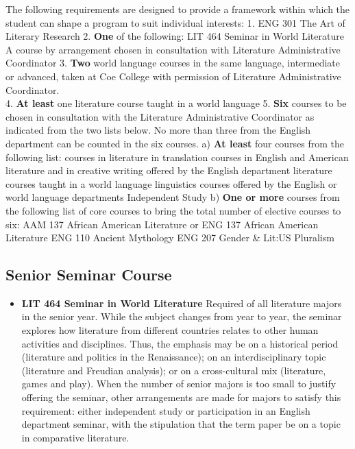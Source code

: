 \documentclass[
  letterpaper,
]{scrbook}
\providecommand{\tightlist}{%
  \setlength{\itemsep}{0pt}\setlength{\parskip}{0pt}}
\begin{document}
The following requirements are designed to provide a framework within
which the student can shape a program to suit individual interests: 1.
ENG 301 The Art of Literary Research 2. \textbf{One} of the following:
LIT 464 Seminar in World Literature A course by arrangement chosen in
consultation with Literature Administrative Coordinator 3. \textbf{Two}
world language courses in the same language, intermediate or advanced,
taken at Coe College with permission of Literature Administrative
Coordinator.\\
4. \textbf{At least} one literature course taught in a world language 5.
\textbf{Six} courses to be chosen in consultation with the Literature
Administrative Coordinator as indicated from the two lists below. No
more than three from the English department can be counted in the six
courses. a) \textbf{At least} four courses from the following list:
courses in literature in translation courses in English and American
literature and in creative writing offered by the English department
literature courses taught in a world language linguistics courses
offered by the English or world language departments Independent Study
b) \textbf{One or more} courses from the following list of core courses
to bring the total number of elective courses to six: AAM 137 African
American Literature or ENG 137 African American Literature ENG 110
Ancient Mythology ENG 207 Gender \& Lit:US Pluralism

\subsection{Senior Seminar Course}\label{senior-seminar-course}

\begin{itemize}
\tightlist
\item
  \textbf{LIT 464 Seminar in World Literature} Required of all
  literature majors in the senior year. While the subject changes from
  year to year, the seminar explores how literature from different
  countries relates to other human activities and disciplines. Thus, the
  emphasis may be on a historical period (literature and politics in the
  Renaissance); on an interdisciplinary topic (literature and Freudian
  analysis); or on a cross-cultural mix (literature, games and play).
  When the number of senior majors is too small to justify offering the
  seminar, other arrangements are made for majors to satisfy this
  requirement: either independent study or participation in an English
  department seminar, with the stipulation that the term paper be on a
  topic in comparative literature.
\end{itemize}
\end{document}
